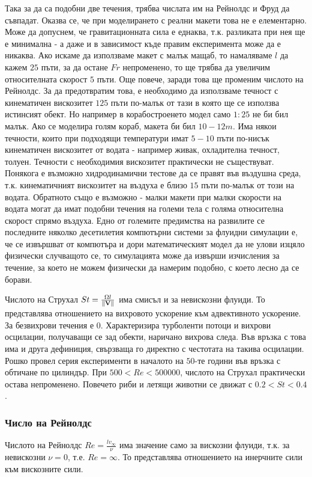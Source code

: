 \documentclass[bulgarian, 12pt]{article}
\begin{document}
Така за да са подобни две течения, трябва числата им на Рейнолдс и Фруд да съвпадат. 
Оказва се, че при моделирането с реални макети това не е елементарно. 
Може да допуснем, че гравитационната сила е еднаква, т.к. разликата при нея ще е минимална - а даже и в зависимост къде правим експеримента може да е никаква.
Ако искаме да използваме макет с малък мащаб, то намаляваме $l$ да кажем $25$ пъти, за да остане $Fr$ непроменено, то ще трябва да увеличим относителната скорост $5$ пъти.
Още повече, заради това ще променим числото на Рейнолдс. За да предотвратим това, е необходимо да използваме течност с кинематичен вискозитет $125$ пъти по-малък от тази в която ще се използва истинсият обект.
Но например в корабостроенето модел само $1:25$ не би бил малък. Ако се моделира голям кораб, макета би бил $10-12m$.
Има някои течности, които при подходящи температури имат $5-10$ пъти по-нисък кинематичен вискозитет от водата - например живак, охладителна течност, толуен.
Течности с необходимия вискозитет практически не съществуват.
Понякога е възможно хидродинамични тестове да се правят във въздушна среда, т.к. кинематичният вискозитет на въздуха е близо $15$ пъти по-малък от този на водата.
Обратното също е възможно - малки макети при малки скорости на водата могат да имат подобни течения на големи тела с голяма относителна скорост спрямо въздуха.
Едно от големите предимства на развилите се последните няколко десетилетия компютърни системи за флуидни симулации е, че се извършват от компютъра и дори математическият модел да не улови изцяло физически случващото се, то симулацията може да извърши изчисления за течение, за което не можем физически да намерим подобно, с което лесно да се борави.

Числото на Струхал $St = \frac{\Omega l}{\norm{\mathbf{V}}}$ има смисъл и за невискозни флуиди.
То представлява отношението на вихровото ускорение към адвективното ускорение.
За безвихрови течения е $0$. Характеризира турболенти потоци и вихрови осцилации, получаващи се зад обекти, наричано вихрова следа.
Във връзка с това има и друга дефиниция, свързваща го директно с честотата на такива осцилации.
Рошко провел серия експерименти в началото на $50$-те години във връзка с обтичане по цилиндър.
При $500 < Re < 500 000$, числото на Струхал практически остава непроменено.
Повечето риби и летящи животни се движат с $0.2 < St < 0.4$.


\subsubsection{Число на Рейнолдс}
Числото на Рейнолдс $Re = \frac{l v_\infty}{\nu}$ има значение само за вискозни флуиди, т.к. за невискозни $\nu = 0$, т.е. $Re = \infty$.
То представлява отношението на инерчните сили към вискозните сили.
\end{document}
